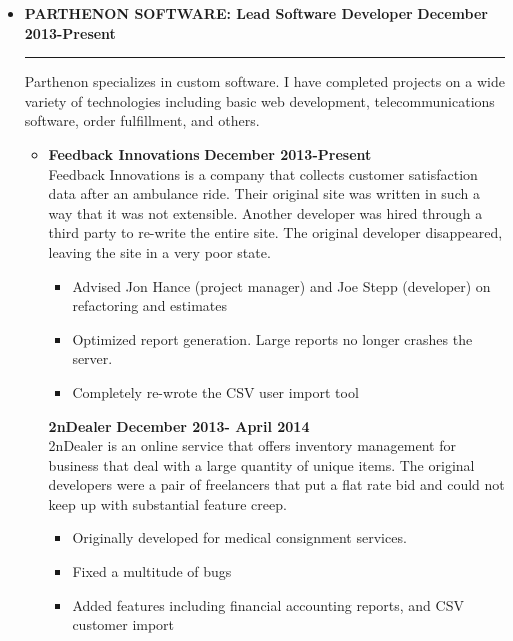 \documentclass[overlapped]{res}
\begin{document}
\begin{resume}
\begin{itemize}[leftmargin=0in]
    \item[] 
        \textbf{PARTHENON SOFTWARE: Lead Software Developer} \hfill \textbf{December 2013-Present} \\[-0.1in] \rule{\textwidth}{0.5pt}
        Parthenon specializes in custom software. I have completed projects on a wide variety of technologies including basic 
        web development, telecommunications software, order fulfillment, and others. \vspace{0.125in}
        \begin{itemize}[leftmargin=0in]
            \item[] 
                \begin{samepage}
                    \textbf{Feedback Innovations} \hfill \textbf{December 2013-Present} \\
                    Feedback Innovations is a company that collects customer satisfaction data after an ambulance ride. Their original site 
                    was written in such a way that it was not extensible. Another developer was hired through a third party to re-write the 
                    entire site. The original developer disappeared, leaving the site in a very poor state.
                    \begin{itemize}
                        \item[\textbullet] Advised Jon Hance (project manager) and Joe Stepp (developer) on refactoring and estimates
                        \item[\textbullet] Optimized report generation. Large reports no longer crashes the server.
                        \item[\textbullet] Completely re-wrote the CSV user import tool
                    \end{itemize}
                \end{samepage}

                \begin{samepage}
                    \textbf{2nDealer} \hfill \textbf{December 2013- April 2014} \\
                    2nDealer is an online service that offers inventory management for business that deal with a large quantity of unique items. 
                    The original developers were a pair of freelancers that put a flat rate bid and could not keep up with substantial feature creep.
                    \begin{itemize}
                        \item[\textbullet] Originally developed for medical consignment services.
                        \item[\textbullet] Fixed a multitude of bugs
                        \item[\textbullet] Added features including financial accounting reports, and CSV customer import
                    \end{itemize}
                \end{samepage}
        \end{itemize}
        \vspace{0.125in}


\end{itemize}
\end{resume}
\end{document}
